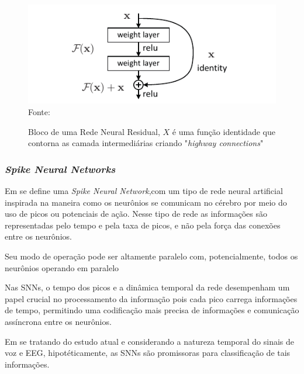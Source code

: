 			\begin{figure}
				\centering
				\caption[bloco de uma Resnet]{Bloco de uma Rede Neural Residual, $X$ é uma função identidade que contorna as camada intermediárias criando "\textit{highway connections}"}
				\includegraphics[width=0.7\linewidth]{images/residualBlock}
				\\ Fonte: \cite{DBLP:journals/corr/HeZRS15}
				\label{fig:residualblock}
			\end{figure}
	
		\subsubsection{\textit{Spike Neural Networks}}
			\par Em \cite{kasabov2018time} se define uma \textit{Spike Neural Network},com um tipo de rede neural artificial inspirada na maneira como os neurônios se comunicam no cérebro por meio do uso de picos ou potenciais de ação. Nesse tipo de rede as informações são representadas pelo tempo e pela taxa de picos, e não pela força das conexões entre os neurônios.
			
			\par Seu modo de operação pode ser altamente paralelo com, potencialmente, todos os neurônios operando em paralelo
			
			\par Nas SNNs, o tempo dos picos e a dinâmica temporal da rede desempenham um papel crucial no processamento da informação pois cada pico carrega informações de tempo, permitindo uma codificação mais precisa de informações e comunicação assíncrona entre os neurônios.
			
			\par Em se tratando do estudo atual e considerando a natureza temporal do sinais de voz e EEG, hipotéticamente, as SNNs são promissoras para classificação de tais informações.